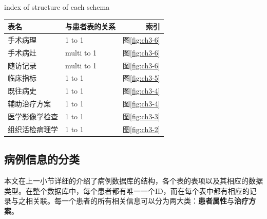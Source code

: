\begin{table}[!hpb]
  \centering
    {index of structure of each schema}
  \label{tab:3-1}
  \begin{tabular}{@{}llr@{}} \toprule

    表名 & 与患者表的关系 & 索引\\ \midrule
    手术病理 & 1 to 1 & 图\ref{fig:ch3-6} \\
    手术病灶 & multi to 1 & 图\ref{fig:ch3-6} \\
    随访记录 & multi to 1 & 图\ref{fig:ch3-6} \\
    临床指标 & 1 to 1 & 图\ref{fig:ch3-5} \\
    既往病史 & 1 to 1 & 图\ref{fig:ch3-4} \\
    辅助治疗方案 & 1 to 1 & 图\ref{fig:ch3-4} \\
    医学影像学检查 & 1 to 1 & 图\ref{fig:ch3-3} \\
    组织活检病理学 & 1 to 1 & 图\ref{fig:ch3-2} \\ \bottomrule
  \end{tabular}
\end{table}

\subsection{病例信息的分类}
\label{para:chap3-1-3}
本文在上一小节详细的介绍了病例数据库的结构，各个表的表项以及其相应的数据类型。在整个数据库中，每个患者都有唯一一个ID，而在每个表中都有相应的记录与之相关联。每一个患者的所有相关信息可以分为两大类：\textbf{患者属性}与\textbf{治疗方案}。

